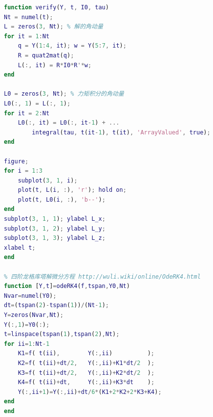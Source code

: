 \begin{lstlisting}[language=matlab]
% 验证角动量定理
function verify(Y, t, I0, tau)
Nt = numel(t);
L = zeros(3, Nt); % 解的角动量
for it = 1:Nt
    q = Y(1:4, it); w = Y(5:7, it);
    R = quat2mat(q);
    L(:, it) = R*I0*R'*w;
end

L0 = zeros(3, Nt); % 力矩积分的角动量
L0(:, 1) = L(:, 1);
for it = 2:Nt
    L0(:, it) = L0(:, it-1) + ...
        integral(tau, t(it-1), t(it), 'ArrayValued', true);
end

figure;
for i = 1:3
    subplot(3, 1, i);
    plot(t, L(i, :), 'r'); hold on;
    plot(t, L0(i, :), 'b--');
end
subplot(3, 1, 1); ylabel L_x;
subplot(3, 1, 2); ylabel L_y;
subplot(3, 1, 3); ylabel L_z;
xlabel t;
end

% 四阶龙格库塔解微分方程 http://wuli.wiki/online/OdeRK4.html
function [Y,t]=odeRK4(f,tspan,Y0,Nt)
Nvar=numel(Y0);
dt=(tspan(2)-tspan(1))/(Nt-1);
Y=zeros(Nvar,Nt);
Y(:,1)=Y0(:);
t=linspace(tspan(1),tspan(2),Nt);
for ii=1:Nt-1
    K1=f( t(ii),        Y(:,ii)          );
    K2=f( t(ii)+dt/2,   Y(:,ii)+K1*dt/2  );
    K3=f( t(ii)+dt/2,   Y(:,ii)+K2*dt/2  );
    K4=f( t(ii)+dt,     Y(:,ii)+K3*dt    );
    Y(:,ii+1)=Y(:,ii)+dt/6*(K1+2*K2+2*K3+K4);
end
end
\end{lstlisting}
